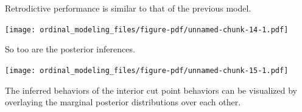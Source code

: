 \documentclass[
  letterpaper,
  DIV=11,
  numbers=noendperiod]{scrartcl}
\newenvironment{Shaded}{\begin{snugshade}}{\end{snugshade}}
\newcommand{\AttributeTok}[1]{\textcolor[rgb]{0.40,0.45,0.13}{#1}}
\newcommand{\ControlFlowTok}[1]{\textcolor[rgb]{0.00,0.23,0.31}{#1}}
\newcommand{\DecValTok}[1]{\textcolor[rgb]{0.68,0.00,0.00}{#1}}
\newcommand{\FloatTok}[1]{\textcolor[rgb]{0.68,0.00,0.00}{#1}}
\newcommand{\FunctionTok}[1]{\textcolor[rgb]{0.28,0.35,0.67}{#1}}
\newcommand{\NormalTok}[1]{\textcolor[rgb]{0.00,0.23,0.31}{#1}}
\newcommand{\OtherTok}[1]{\textcolor[rgb]{0.00,0.23,0.31}{#1}}
\newcommand{\SpecialCharTok}[1]{\textcolor[rgb]{0.37,0.37,0.37}{#1}}
\newcommand{\StringTok}[1]{\textcolor[rgb]{0.13,0.47,0.30}{#1}}
\begin{document}
Retrodictive performance is similar to that of the previous model.

\begin{Shaded}
\end{Shaded}

\texttt{[image: ordinal\_modeling\_files/figure-pdf/unnamed-chunk-14-1.pdf]}

So too are the posterior inferences.

\begin{Shaded}
\end{Shaded}

\texttt{[image: ordinal\_modeling\_files/figure-pdf/unnamed-chunk-15-1.pdf]}

The inferred behaviors of the interior cut point behaviors can be
visualized by overlaying the marginal posterior distributions over each
other.
\end{document}
